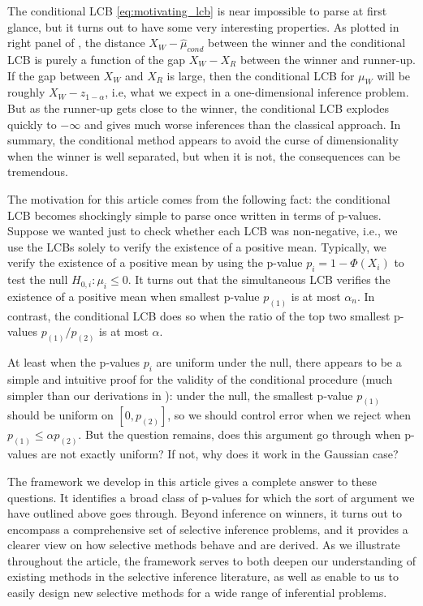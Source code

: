 \documentclass{article}
\begin{document}
The conditional LCB \eqref{eq:motivating_lcb} is near impossible to parse at first glance, but it turns out to have some very interesting properties. As plotted in right panel of , the distance $X_W - \hat{\mu}_{cond}$ between the winner and the conditional LCB is purely a function of the gap $X_W - X_R$ between the winner and runner-up. If the gap between $X_W$ and $X_R$ is large, then the conditional LCB for $\mu_W$ will be roughly $X_{W} - z_{1-\alpha}$, i.e, what we expect in a one-dimensional inference problem. But as the runner-up gets close to the winner, the conditional LCB explodes quickly to $-\infty$ and gives much worse inferences than the classical approach. In summary, the conditional method appears to avoid the curse of dimensionality when the winner is well separated, but when it is not, the consequences can be tremendous. 

The motivation for this article comes from the following fact: the conditional LCB becomes shockingly simple to parse once written in terms of p-values. Suppose we wanted just to check whether each LCB was non-negative, i.e., we use the LCBs solely to verify the existence of a positive mean. Typically, we verify the existence of a positive mean by using the p-value $p_i = 1 - \Phi(X_i)$ to test the null $H_{0, i} : \mu_i \leq 0$. It turns out that the simultaneous LCB verifies the existence of a positive mean when smallest p-value $p_{(1)}$ is at most $\alpha_n$. In contrast, the conditional LCB does so when the ratio of the top two smallest p-values $p_{(1)}/p_{(2)}$ is at most $\alpha$. 

At least when the p-values $p_i$ are uniform under the null, there appears to be a simple and intuitive proof for the validity of the conditional procedure (much simpler than our derivations in ): under the null, the smallest p-value $p_{(1)}$ should be uniform on $[0, p_{(2)}]$, so we should control error when we reject when $p_{(1)} \leq \alpha p_{(2)}$. But the question remains, does this argument go through when p-values are not exactly uniform? If not, why does it work in the Gaussian case?

The framework we develop in this article gives a complete answer to these questions. It identifies a broad class of p-values for which the sort of argument we have outlined above goes through. Beyond inference on winners, it turns out to encompass a comprehensive set of selective inference problems, and it provides a clearer view on how selective methods behave and are derived. As we illustrate throughout the article, the framework serves to both deepen our understanding of existing methods in the selective inference literature, as well as enable to us to easily design new selective methods for a wide range of inferential problems. 
\end{document}
